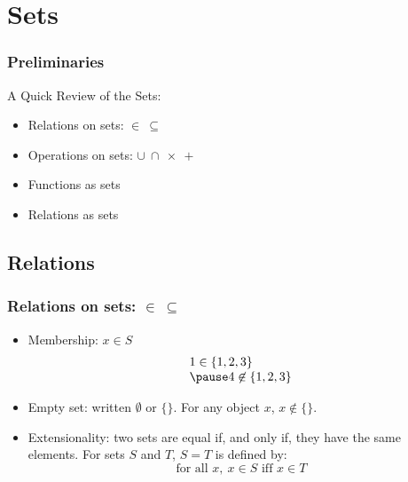 \documentclass{beamer}
\newtheorem{remark}{}
\begin{document}
\section{Sets}

\frame
{
    \frametitle{Preliminaries}
    

A Quick Review of the Sets: 
\begin{itemize}
\item Relations on sets:  $\in ~ \subseteq$
\item Operations on sets: $\cup~ \cap~ \times ~ +$ 
\item Functions as sets
\item Relations as sets
\end{itemize}

}

\subsection{Relations}
%
\frame
{
    \frametitle{Relations on sets: $\in ~ \subseteq$}

\begin{itemize}    
\item Membership: 
\(
x \in S
\)
\\
\[ 
\begin{array}{lcl}
1 \in \{1,2,3\}
\\
\pause
4 \not\in \{1,2,3\}
\end{array}
\]
\pause
\item Empty set: written $\emptyset$ or $\{\}$. For any object $x$, $x \not\in \{\}$.

\pause

\item Extensionality: two sets are equal if, and only if, they have the same elements. For sets $S$ and $T$, $S = T$ is defined by:
\[
\mbox{for all }x, ~x\in S \mbox{ iff } x \in T
\]
\end{itemize}
}

\end{document}
